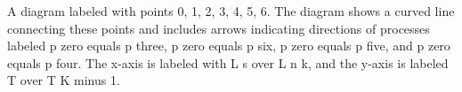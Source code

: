 A diagram labeled with points 0, 1, 2, 3, 4, 5, 6. The diagram shows a curved line connecting these points and includes arrows indicating directions of processes labeled p zero equals p three, p zero equals p six, p zero equals p five, and p zero equals p four. The x-axis is labeled with L s over L n k, and the y-axis is labeled T over T K minus 1.